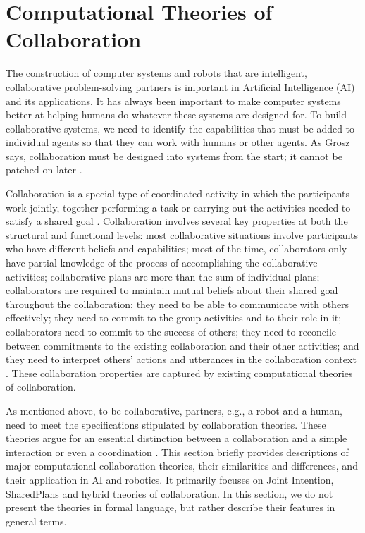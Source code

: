 \documentclass[12pt]{report}
\begin{document}
\section{Computational Theories of Collaboration}
The construction of computer systems and robots that are intelligent,
collaborative problem-solving partners is important in Artificial Intelligence
(AI) and its applications. It has always been important to make computer systems
better at helping humans do whatever these systems are designed for. To build
collaborative systems, we need to identify the capabilities that must be added
to individual agents so that they can work with humans or other agents. As Grosz
says, collaboration must be designed into systems from the start; it cannot be
patched on later \cite{grosz:collaborative-systems}.

Collaboration is a special type of coordinated activity in which the
participants work jointly, together performing a task or carrying out the
activities needed to satisfy a shared goal \cite{grosz:collaboration}.
Collaboration involves several key properties at both the structural and
functional levels: most collaborative situations involve participants who have
different beliefs and capabilities; most of the time, collaborators only have
partial knowledge of the process of accomplishing the collaborative activities;
collaborative plans are more than the sum of individual plans; collaborators are
required to maintain mutual beliefs about their shared goal throughout the
collaboration; they need to be able to communicate with others effectively; they
need to commit to the group activities and to their role in it; collaborators
need to commit to the success of others; they need to reconcile between
commitments to the existing collaboration and their other activities; and they
need to interpret others' actions and utterances in the collaboration context
\cite{grosz:mice-menus}. These collaboration properties are captured by existing
computational theories of collaboration.

As mentioned above, to be collaborative, partners, e.g., a robot and a human,
need to meet the specifications stipulated by collaboration theories. These
theories argue for an essential distinction between a collaboration and a simple
interaction or even a coordination \cite{grosz:shared-plans,
lochbaum:collaborative-planning}. This section briefly provides descriptions of
major computational collaboration theories, their similarities and differences,
and their application in AI and robotics. It primarily focuses on Joint
Intention, SharedPlans and hybrid theories of collaboration. In this section, we
do not present the theories in formal language, but rather describe their
features in general terms.
\end{document}
